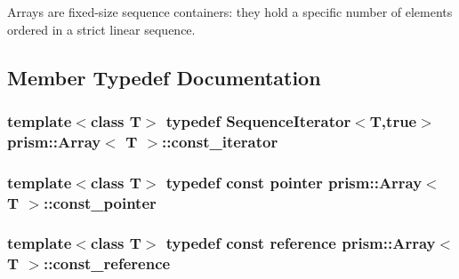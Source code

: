 Arrays are fixed-\/size sequence containers\+: they hold a specific number of elements ordered in a strict linear sequence. 

\subsection{Member Typedef Documentation}
\subsubsection[{\texorpdfstring{const\+\_\+iterator}{const_iterator}}]{\setlength{\rightskip}{0pt plus 5cm}template$<$class T$>$ typedef {\bf Sequence\+Iterator}$<$T,true$>$ {\bf prism\+::\+Array}$<$ T $>$\+::{\bf const\+\_\+iterator}}\hypertarget{classprism_1_1_array_a1654729fe986281be9c0064999caf3d7}{}\label{classprism_1_1_array_a1654729fe986281be9c0064999caf3d7}
\subsubsection[{\texorpdfstring{const\+\_\+pointer}{const_pointer}}]{\setlength{\rightskip}{0pt plus 5cm}template$<$class T$>$ typedef const {\bf pointer} {\bf prism\+::\+Array}$<$ T $>$\+::{\bf const\+\_\+pointer}}\hypertarget{classprism_1_1_array_a42db67aa315835ceb28016cedc9fc300}{}\label{classprism_1_1_array_a42db67aa315835ceb28016cedc9fc300}
\subsubsection[{\texorpdfstring{const\+\_\+reference}{const_reference}}]{\setlength{\rightskip}{0pt plus 5cm}template$<$class T$>$ typedef const {\bf reference} {\bf prism\+::\+Array}$<$ T $>$\+::{\bf const\+\_\+reference}}\hypertarget{classprism_1_1_array_a84d3a2c653830c8005e959d99faf0f06}{}\label{classprism_1_1_array_a84d3a2c653830c8005e959d99faf0f06}
